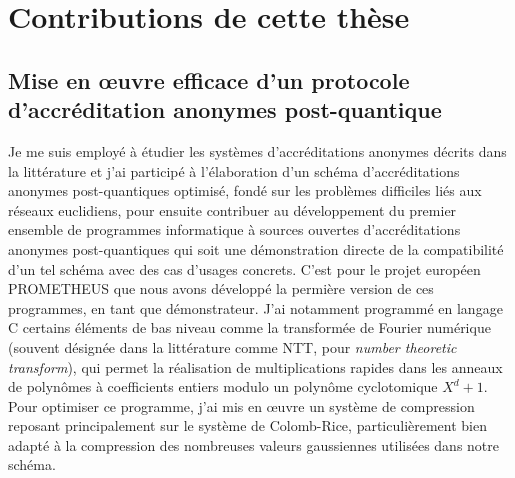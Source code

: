 
\section{Contributions de cette thèse} %
\label{sec:contributions}


\subsection[Premier article]{Mise en œuvre efficace d’un protocole d’accréditation anonymes post-quantique~\cite{ARES:CRSS23}} %
\label{sub:paper_1}


Je me suis employé à étudier les systèmes d’accréditations anonymes décrits dans
la littérature et j’ai participé à l’élaboration d’un schéma d’accréditations anonymes post-quantiques optimisé, fondé
sur les problèmes diﬀiciles liés aux réseaux euclidiens, pour ensuite contribuer au développement du premier ensemble de programmes
informatique à sources ouvertes d’accréditations anonymes post-quantiques qui soit une démonstration directe de la
compatibilité d’un tel schéma avec des cas d’usages concrets.
C’est pour le projet européen PROMETHEUS que nous avons développé la permière version de ces programmes, en tant que démonstrateur.
J’ai notamment programmé en langage C certains éléments de bas niveau comme la transformée de Fourier numérique (souvent désignée dans la littérature comme NTT, pour \textit{number theoretic transform}), qui permet la réalisation de multiplications rapides dans les anneaux de polynômes à coefficients entiers modulo un polynôme cyclotomique $X^d + 1$. Pour optimiser ce programme, j’ai mis en œuvre un système de compression reposant principalement sur le système de Colomb-Rice, particulièrement bien adapté à la compression des nombreuses valeurs gaussiennes utilisées dans notre schéma.


